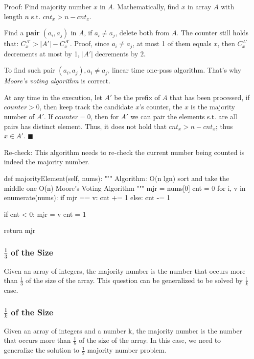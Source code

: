 Proof: Find majority number $x$ in $A$. Mathematically, find $x$ in array $A$ with length $n$ s.t. $cnt_x > n -cnt_x$. 

Find a \textbf{pair} $(a_i, a_j)$ in $A$, if $a_i \neq a_j$, delete both from $A$. The counter  still
holds that: $C^{A'}_x > |A'|-C^{A'}_x$. Proof, since $a_i\neq a_j$, at most 1 of them
equals $x$, then $C^{A'}_x$ decrements at most by 1, $|A'|$ decrements by 2.

To find such pair $(a_i, a_j), a_i\neq a_j$, linear time one-pass algorithm. That's
why \textit{Moore's voting algorithm} is correct.

At any time in the execution, let $A'$ be the prefix of $A$ that has been processed,
if $counter>0$, then keep track the candidate $x$'s counter, the $x$
is the majority number of $A'$.  If $counter =0$, then for $A'$ we can pair the elements
s.t. are all pairs has distinct element. Thus, it does not hold that $cnt_x>n-cnt_x$;
thus $x\in A'$. $\blacksquare$
 
Re-check: This algorithm needs to re-check the current number being counted is indeed the majority number.    

\begin{python}
def majorityElement(self, nums):
    """
    Algorithm:
    O(n lgn) sort and take the middle one
    O(n) Moore's Voting Algorithm
    """
    mjr = nums[0]
    cnt = 0
    for i, v in enumerate(nums):
        if mjr == v:
            cnt += 1
        else:
            cnt -= 1

        if cnt < 0:
            mjr = v
            cnt = 1

    return mjr

\end{python}
\subsubsection{$\frac{1}{3}$ of the Size}
Given an array of integers, the majority number is the number that occurs more than $\frac{1}{3}$ of the size of the array. This question can be generalized to be solved by $\frac{1}{k}$ case. 

\subsubsection{$\frac{1}{k}$ of the Size}
Given an array of integers and a number k, the majority number is the number that occurs more than $\frac{1}{k}$ of the size of the array. In this case, we need to generalize the solution to $\frac{1}{2}$ majority number problem.

